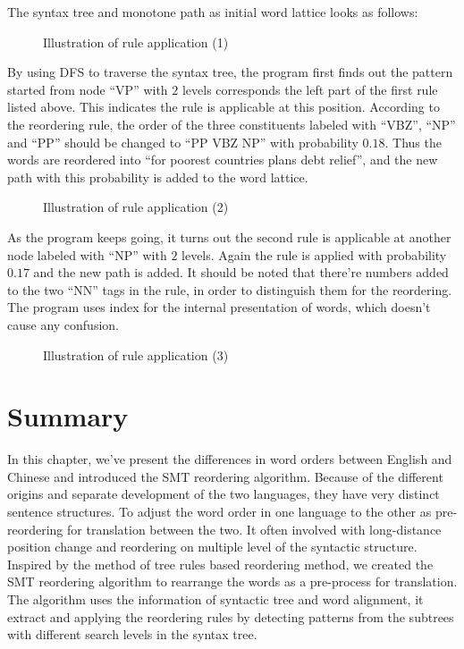 The syntax tree and monotone path as initial word lattice looks as follows:
\begin{figure}[H]
\centering
\subfigure{

}
\subfigure{

}
\caption{Illustration of rule application (1)}
\end{figure}

By using DFS to traverse the syntax tree, the program first finds out the pattern started from node ``VP'' with $2$ levels corresponds the left part of the first rule listed above. This indicates the rule is applicable at this position. According to the reordering rule, the order of the three constituents labeled with ``VBZ'', ``NP'' and ``PP'' should be changed to ``PP VBZ NP'' with probability $0.18$. Thus the words are reordered into ``for poorest countries plans debt relief'', and the new path with this probability is added to the word lattice.

\begin{figure}[H]
\centering
\subfigure{

}
\subfigure{

}
\caption{Illustration of rule application (2)}
\end{figure}

As the program keeps going, it turns out the second rule is applicable at another node labeled with ``NP'' with $2$ levels. Again the rule is applied with probability $0.17$ and the new path is added. It should be noted that there're numbers added to the two ``NN'' tags in the rule, in order to distinguish them for the reordering. The program uses index for the internal presentation of words, which doesn't cause any confusion.

\begin{figure}[H]
\centering
\subfigure{

}
\subfigure{

}
\caption{Illustration of rule application (3)}
\end{figure}

\section{Summary}
In this chapter, we've present the differences in word orders between English and Chinese and introduced the SMT reordering algorithm. Because of the different origins and separate development of the two languages, they have very distinct sentence structures. To adjust the word order in one language to the other as pre-reordering for translation between the two. It often involved with long-distance position change and reordering on multiple level of the syntactic structure. Inspired by the method of tree rules based reordering method, we created the SMT reordering algorithm to rearrange the words as a pre-process for translation. The algorithm uses the information of syntactic tree and word alignment, it extract and applying the reordering rules by detecting patterns from the subtrees with different search levels in the syntax tree.
